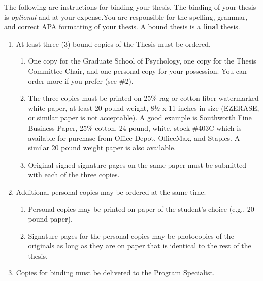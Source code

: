 \documentclass[openany]{book}
\providecommand{\tightlist}{%
  \setlength{\itemsep}{0pt}\setlength{\parskip}{0pt}}
\begin{document}
The following are instructions for binding your thesis. The binding of your thesis is \emph{optional} and at your expense.You are responsible for the spelling, grammar, and correct APA formatting of your thesis. A bound thesis is a \textbf{final} thesis.

\begin{enumerate}
\def\labelenumi{\arabic{enumi}.}
\tightlist
\item
  At least three (3) bound copies of the Thesis must be ordered.

  \begin{enumerate}
  \def\labelenumii{\alph{enumii}.}
  \tightlist
  \item
    One copy for the Graduate School of Psychology, one copy for the Thesis Committee Chair, and one personal copy for your possession. You can order more if you prefer (see \#2).
  \item
    The three copies must be printed on 25\% rag or cotton fiber watermarked white paper, at least 20 pound weight, 8½ x 11 inches in size (EZERASE, or similar paper is not acceptable). A good example is Southworth Fine Business Paper, 25\% cotton, 24 pound, white, stock \#403C which is available for purchase from Office Depot, OfficeMax, and Staples. A similar 20 pound weight paper is also available.
  \item
    Original signed signature pages on the same paper must be submitted with each of the three copies.
  \end{enumerate}
\item
  Additional personal copies may be ordered at the same time.

  \begin{enumerate}
  \def\labelenumii{\alph{enumii}.}
  \tightlist
  \item
    Personal copies may be printed on paper of the student's choice (e.g., 20 pound paper).
  \item
    Signature pages for the personal copies may be photocopies of the originals as long as they are on paper that is identical to the rest of the thesis.
  \end{enumerate}
\item
  Copies for binding must be delivered to the Program Specialist.


\end{enumerate}
\end{document}

